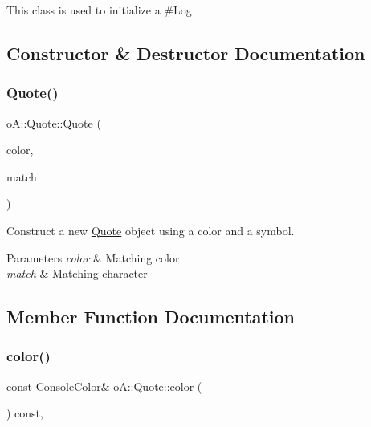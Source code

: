 This class is used to initialize a \#\+Log 

\subsection{Constructor \& Destructor Documentation}
\mbox{\label{classo_a_1_1_quote_a106d98164983c0d65e8b181275ab763b}} 
\subsubsection{\texorpdfstring{Quote()}{Quote()}}
{\footnotesize\ttfamily o\+A\+::\+Quote\+::\+Quote (\begin{DoxyParamCaption}\item[{const \mbox{\hyperlink{namespaceo_a_a747e07c1977a29f3e1d38683043ec927}{Console\+Color}} \&}]{color,  }\item[{char}]{match }\end{DoxyParamCaption})\hspace{0.3cm}{\ttfamily [inline]}}



Construct a new \mbox{\hyperlink{classo_a_1_1_quote}{Quote}} object using a color and a symbol. 


\begin{DoxyParams}{Parameters}
{\em color} & Matching color \\
\hline
{\em match} & Matching character \\
\hline
\end{DoxyParams}


\subsection{Member Function Documentation}
\mbox{\label{classo_a_1_1_quote_a2230c25c43af7317d5ab5785b382f2ce}} 
\subsubsection{\texorpdfstring{color()}{color()}}
{\footnotesize\ttfamily const \mbox{\hyperlink{namespaceo_a_a747e07c1977a29f3e1d38683043ec927}{Console\+Color}}\& o\+A\+::\+Quote\+::color (\begin{DoxyParamCaption}\item[{void}]{ }\end{DoxyParamCaption}) const\hspace{0.3cm}{\ttfamily [inline]}, {\ttfamily [noexcept]}}




